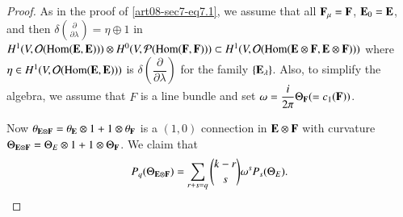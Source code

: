 \begin{proof}
As in the proof of \eqref{art08-sec7-eq7.1}, we assume that all $\mathbf{F}_{\mu}=\mathbf{F}$, $\mathbf{E}_{0}=\mathbf{E}$, and then $\delta\binom{\partial}{\partial \lambda}=\eta\oplus 1$ in $H^{1}(V,\mathcal{O}(\operatorname{\mathrm{Hom}}(\mathbf{E},\mathbf{E})))\otimes H^{0}(V,\mathcal{P}(\operatorname{\mathrm{Hom}}(\mathbf{F},\mathbf{F})))\subset H^{1}(V,\mathcal{O}(\operatorname{\mathrm{Hom}}(\mathbf{E}\otimes \mathbf{F},\mathbf{E}\otimes\mathbf{F})))$ where $\eta\in H^{1}(V,\mathcal{O}(\operatorname{\mathrm{Hom}}(\mathbf{E},\mathbf{E})))$ is $\delta\left(\dfrac{\partial}{\partial \lambda}\right)$ for the family $\{\mathbf{E}_{\lambda}\}$. Also, to simplify the algebra, we assume that $F$ is a line bundle and set $\omega=\dfrac{i}{2\pi}\Theta_{\mathbf{F}}(=c_{1}(\mathbf{F}))$.

Now $\theta_{\mathbf{E}\otimes \mathbf{F}}=\theta_{\mathbf{E}}\otimes 1+1\otimes \theta_{\mathbf{F}}$ is a $(1,0)$ connection in $\mathbf{E}\otimes \mathbf{F}$ with curvature $\Theta_{\mathbf{E}\otimes \mathbf{F}}=\Theta_{E}\otimes 1+1\otimes \Theta_{\mathbf{F}}$. We claim that
\begin{equation}
P_{q}(\Theta_{\mathbf{E}\otimes\mathbf{F}})=\sum\limits_{r+s=q}\binom{k-r}{s}\omega^{s}P_{s}(\Theta_{E}).\label{art08-sec7-eq7.8}
\end{equation}
\end{proof}

